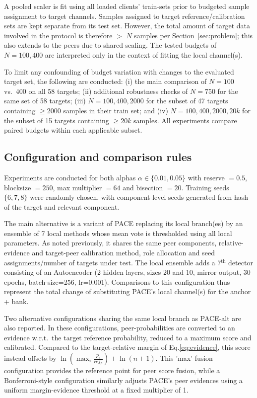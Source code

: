 A pooled scaler is fit using all loaded clients' train-sets prior to budgeted sample assignment to target channels. Samples assigned to target reference/calibration sets are kept separate from its test set. However, the total amount of target data involved in the protocol is therefore $>$ $N$ samples per Section~\ref{sec:problem}; this also extends to the peers due to shared scaling. The tested budgets of $N=100,400$ are interpreted only in the context of fitting the local channel(s).

To limit any confounding of budget variation with changes to the evaluated target set, the following are conducted:
(i) the main comparison of $N=100$ vs.\ 400 on all 58 targets;
(ii) additional robustness checks of $N=750$ for the same set of 58 targets;
(iii) $N=100,400,2000$ for the subset of 47 targets containing $\geq 2000$ samples in their train set; and
(iv) $N=100,400,2000,20k$ for the subset of 15 targets containing $\geq 20k$ samples. All experiments compare paired budgets within each applicable subset.

\subsection{Configuration and comparison rules} 
Experiments are conducted for both alphas $\alpha \in \{0.01, 0.05\}$ with reserve $=0.5$, blocksize $=250$, max multiplier $= 64$ and bisection $= 20$. Training seeds $\{6,7,8\}$ were randomly chosen, with component-level seeds generated from hash of the target and relevant component.

The main alternative is a variant of PACE replacing its local branch(es) by an ensemble of 7 local methods whose mean vote is thresholded using all local parameters. As noted previously, it shares the same peer components, relative-evidence and target-peer calibration method, role allocation and seed assignments/number of targets under test. The local ensemble adds a 7$^{\text{th}}$ detector consisting of an Autoencoder (2 hidden layers, sizes 20 and 10, mirror output, 30 epochs, batch-size=256, lr=0.001). Comparisons to this configuration thus represent the total change of substituting PACE's local channel(s) for the anchor + bank.

Two alternative configurations sharing the same local branch as PACE-alt are also reported. In these configurations, peer-probabilities are converted to an evidence w.r.t.\ the target reference probability, reduced to a maximum score and calibrated. Compared to the target-relative margin of Eq.\ref{eq:evidence}, this score instead offsets by $\ln(\max_{i}\frac{p_i}{ref_p}) + \ln(n+1)$. This 'max'-fusion configuration provides the reference point for peer score fusion, while a Bonferroni-style configuration similarly adjusts PACE's peer evidences using a uniform margin-evidence threshold at a fixed multiplier of 1.

